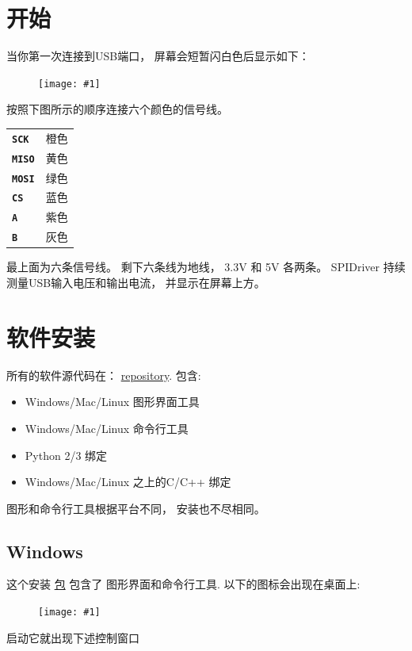 \documentclass{article}
\newcommand{\png}[1]{
\begin{figure}[H]
\begin{center}
\texttt{[image: \#1]}
\end{center}
\end{figure}
}
\newcommand{\mach}[1]{\texttt{\textbf{#1}}}
\newcommand{\gap}{\vspace{10pt}}
\begin{document}
\newpage
\section{开始}


当你第一次连接到USB端口， 屏幕会短暂闪白色后显示如下： 

\png{img/spidriver/spidriver-close}

按照下图所示的顺序连接六个颜色的信号线。 
\gap
\begin{center}
\begin{tabular}{ll}
\hline
\mach{SCK}  & 橙色 \\
\mach{MISO} & 黄色 \\
\mach{MOSI} & 绿色  \\
\mach{CS}   & 蓝色   \\
\mach{A}    & 紫色 \\
\mach{B}    & 灰色   \\
\hline
\end{tabular}
\end{center}
\gap

最上面为六条信号线。 剩下六条线为地线， 3.3V 和 5V 各两条。 
SPIDriver 持续测量USB输入电压和输出电流， 并显示在屏幕上方。 


\newpage
\section{软件安装}

所有的软件源代码在： 
\href{https://github.com/jamesbowman/spidriver}{repository}.
包含:

\begin{itemize}
\item Windows/Mac/Linux 图形界面工具
\item Windows/Mac/Linux 命令行工具
\item Python 2/3  绑定
\item Windows/Mac/Linux 之上的C/C++ 绑定
\end{itemize}

图形和命令行工具根据平台不同， 安装也不尽相同。
\subsection{Windows}

这个安装
\href{https://spidriver.com/windows}{包}
包含了 图形界面和命令行工具.
以下的图标会出现在桌面上:

\png{img/spidriver/icon}

启动它就出现下述控制窗口
\end{document}
